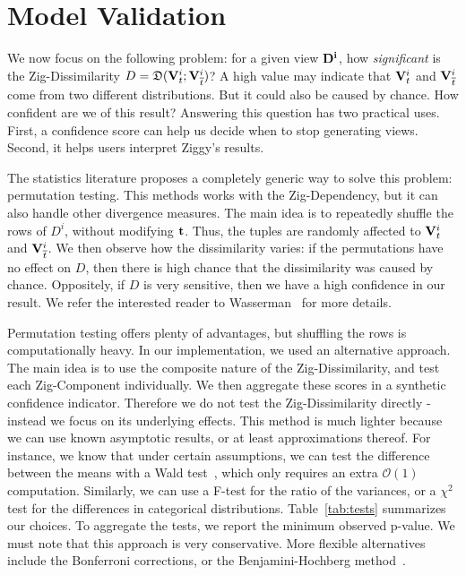 \section{Model Validation}
\label{sec:validation}

We now focus on the following problem: for a given view $\mathbf{D^i}$, how
\emph{significant} is the Zig-Dissimilarity $D = \mathfrak{D}( \mathbf{V}^i_t  ;
\mathbf{V}^i_{\overline{t}})$? A high value may indicate that $\mathbf{V}^i_t$ and
$\mathbf{V}^i_{\overline{t}}$ come from two different distributions.  But it could
also be caused by chance. How confident are we of this result? Answering this
question has two practical uses. First, a confidence score can help us decide
when to stop generating views. Second, it helps users interpret Ziggy's results.

The statistics literature proposes a completely ge\-ne\-ric way to solve
this problem: permutation testing. This methods works with the Zig-Dependency,
but it can also handle other divergence measures. The main idea is to
repeatedly shuffle the rows of $D^i$, without modifying $\mathbf{t}$. Thus, the
tuples are randomly affected to $\mathbf{V}^i_t$ and $\mathbf{V}^i_{\overline{t}}$. We
then observe how the dissimilarity varies: if the permutations have no
effect on $D$, then there is high chance that the dissimilarity was caused by
chance.  Oppositely, if $D$ is very sensitive,
then we have a high confidence in our result. We refer the interested
reader to Wasserman~\cite{wasserman2013all} for more details.

Permutation testing offers plenty of advantages, but shuffling the rows is
computationally heavy. In our implementation, we used an alternative approach.
The main idea is to use the composite nature of the Zig-Dissimilarity, and test
each Zig-Component individually. We then aggregate these scores in a synthetic
confidence indicator. Therefore we do not test the Zig-Dissimilarity directly -
instead we focus on its underlying effects.  This method is much lighter
because we can use known asymptotic results, or at least approximations
thereof. For instance, we know that under certain assumptions, we can test the
difference between the means with a Wald test~\cite{wasserman2013all}, which
only requires an extra $\mathcal{O}(1)$ computation.  Similarly, we can use a
F-test for the ratio of the variances, or a $\chi^2$ test for the differences
in categorical distributions.  Table~\ref{tab:tests} summarizes our choices. 
To aggregate the tests, we report the minimum observed p-value. We must note
that this approach is very conservative. More flexible alternatives include
the Bonferroni corrections, or the Benjamini-Hochberg
method~\cite{wasserman2013all}.

